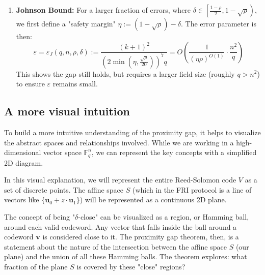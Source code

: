 \documentclass{article}
\begin{document}
\begin{tcolorbox}[breakable, title={Definition: The Proximity Gap for Reed-Solomon Codes}]
\begin{enumerate}
    \item \textbf{Johnson Bound:} For a larger fraction of errors, where $\delta \in \left[\frac{1-\rho}{2}, 1-\sqrt{\rho}\right)$, we first define a "safety margin" $\eta := (1 - \sqrt{\rho}) - \delta$. The error parameter is then:
    \[ \varepsilon = \varepsilon_J(q, n, \rho, \delta) := \frac{(k+1)^2}{\left(2 \min\left(\eta, \frac{\sqrt{\rho}}{20}\right)\right)^7 q} = O\left(\frac{1}{(\eta\rho)^{O(1)}} \cdot \frac{n^2}{q}\right) \]
    This shows the gap still holds, but requires a larger field size (roughly $q > n^2$) to ensure $\varepsilon$ remains small.
\end{enumerate}
\end{tcolorbox}





\subsection{A more visual intuition}

To build a more intuitive understanding of the proximity gap, it helps to visualize the abstract spaces and relationships involved. While we are working in a high-dimensional vector space $\mathbb{F}_q^n$, we can represent the key concepts with a simplified 2D diagram.

In this visual explanation, we will represent the entire Reed-Solomon code $V$ as a set of discrete points. The affine space $S$ (which in the FRI protocol is a line of vectors like $\{\mathbf{u}_0 + z \cdot \mathbf{u}_1\}$) will be represented as a continuous 2D plane.

The concept of being "$\delta$-close" can be visualized as a region, or Hamming ball, around each valid codeword. Any vector that falls inside the ball around a codeword $\mathbf{v}$ is considered close to it. The proximity gap theorem, then, is a statement about the nature of the intersection between the affine space $S$ (our plane) and the union of all these Hamming balls. The theorem explores: what fraction of the plane $S$ is covered by these "close" regions?




 
\tikzset{
pattern size/.store in=\mcSize, 
pattern size = 5pt,
pattern thickness/.store in=\mcThickness, 
pattern thickness = 0.3pt,
pattern radius/.store in=\mcRadius, 
pattern radius = 1pt}
\makeatletter
{}
\makeatother
\end{document}
